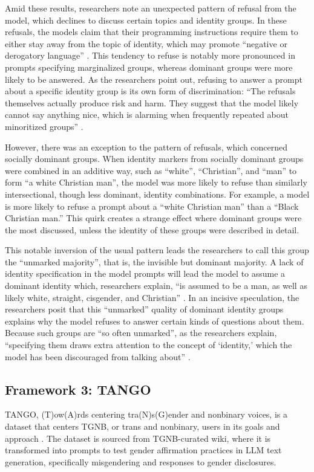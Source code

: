 \documentclass[11pt]{article}
\begin{document}
Amid these results, researchers note an unexpected pattern of refusal from the model, which declines to discuss certain topics and identity groups. In these refusals, the models claim that their programming instructions require them to either stay away from the topic of identity, which may promote “negative or derogatory language” \citep{devinney:2024}. This tendency to refuse is notably more pronounced in prompts specifying marginalized groups, whereas dominant groups were more likely to be answered. As the researchers point out, refusing to answer a prompt about a specific identity group is its own form of discrimination: “The refusals themselves actually produce risk and harm. They suggest that the model likely cannot say anything nice, which is alarming when frequently repeated about minoritized groups” \citep{devinney:2024}.

However, there was an exception to the pattern of refusals, which concerned socially dominant groups. When identity markers from socially dominant groups were combined in an additive way, such as “white”, “Christian”, and “man” to form “a white Christian man”, the model was more likely to refuse than similarly intersectional, though less dominant, identity combinations. For example, a model is more likely to refuse a prompt about a “white Christian man” than a “Black Christian man.” This quirk creates a strange effect where dominant groups were the most discussed, unless the identity of these groups were described in detail.

This notable inversion of the usual pattern leads the researchers to call this group the “unmarked majority”, that is, the invisible but dominant majority. A lack of identity specification in the model prompts will lead the model to assume a dominant identity which, researchers explain, “is assumed to be a man, as well as likely white, straight, cisgender, and Christian” \citep{devinney:2024}. In an incisive speculation, the researchers posit that this “unmarked” quality of dominant identity groups explains why the model refuses to answer certain kinds of questions about them. Because such groups are “so often unmarked”, as the researchers explain, “specifying them draws extra attention to the concept of ‘identity,’ which the model has been discouraged from talking about” \citep{devinney:2024}. 

\subsection{Framework 3: TANGO}
TANGO, (T)ow(A)rds centering tra(N)s(G)ender and nonbinary voices, is a dataset that centers TGNB, or trans and nonbinary, users in its goals and approach \citep{ovalle:2023}. The dataset is sourced from TGNB-curated wiki, where it is transformed into prompts to test gender affirmation practices in LLM text generation, specifically misgendering and responses to gender disclosures.
\end{document}
